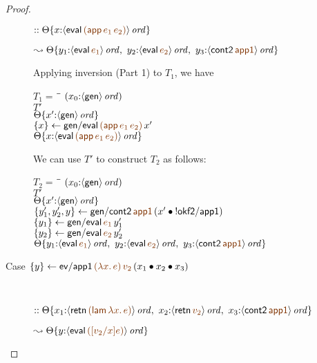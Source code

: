 \begin{proof}
\begin{description}
\qquad
  $::
   \tackon{\Theta}
     {x{:}\istrue{\susp{{\sf eval}\,\lf{({\sf app}\,e_1\,e_2)}}}}$

\qquad\qquad
  $\leadsto
   \tackon{\Theta}
     {y_1{:}\istrue{\susp{{\sf eval}\,\lf{e_1}}}, ~
      y_2{:}\istrue{\susp{{\sf eval}\,\lf{e_2}}}, ~
      y_3{:}\istrue{\susp{{\sf cont2}\,\lf{\sf app1}}}}$
\medskip

Applying inversion (Part 1) to $T_1$, we have 

\begin{tabbing}
$T_1 = ~$ \= \qquad \= $(x_0{:}{\langle {\sf gen} \rangle}\,{{\it ord}})$
\\
\>$T'$
\\
\>\>${\Theta}\{{x'{:}{\langle {\sf gen} \rangle}\,{{\it ord}}}\}$
\\
\>$\trstep{x}{{\sf gen/eval}\,\lf{({\sf app}\,e_1\,e_2)}\,x'}$
\\
\>\>$\tackon{\Theta}{x{:}\istrue{\susp{{\sf eval}\,\lf{({\sf app}\,e_1\,e_2)}}}}$
\end{tabbing}

We can use $T'$ to construct $T_2$ as follows:

\begin{tabbing}
$T_2 = ~$ \= \qquad \= $(x_0{:}{\langle {\sf gen} \rangle}\,{{\it ord}})$
\\
\>$T'$
\\
\>\>${\Theta}\{{x'{:}{\langle {\sf gen} \rangle}\,{{\it ord}}}\}$
\\
\>$\trstep{y_1',y_2',y}{{\sf gen/cont2}\,\lf{{\sf app1}}\,(\tfuser{x'}{\tbangr{{\sf okf2/app1}}})}$
\\
\>$\trstep{y_1}{{\sf gen/eval}\,\lf{e_1}\,y_1'}$
\\
\>$\trstep{y_2}{{\sf gen/eval}\,\lf{e_2}\,y_2'}$
\\
\>\>$\tackon{\Theta}{y_1{:}\istrue{\susp{{\sf eval}\,\lf{e_1}}}, ~
      y_2{:}\istrue{\susp{{\sf eval}\,\lf{e_2}}}, ~
      y_3{:}\istrue{\susp{{\sf cont2}\,\lf{\sf app1}}}}$
\end{tabbing}

\item 
  [Case $\trstep{y}{{\sf ev/app1}\,\lf{(\lambda x.\,e)}\,\lf{v_2}\,(\tfuser{x_1}{\tfuser{x_2}{x_3}})}$]~

\qquad
  $::
   \tackon{\Theta}{x_1{:}\istrue{\susp{{\sf retn}\,\lf{({\sf lam}\,\lambda x.\,e)}}}, ~
                   x_2{:}\istrue{\susp{{\sf retn}\,\lf{v_2}}}, ~
                   x_3{:}\istrue{\susp{{\sf cont2}\,\lf{\sf app1}}}}$

\qquad\qquad
  $\leadsto
   \tackon{\Theta}{y{:}\istrue{\susp{{\sf eval}\,\lf{([v_2/x]e)}}}}$


\end{description}
\end{proof}
